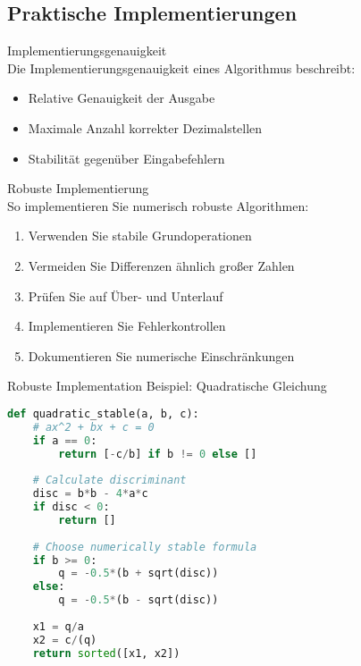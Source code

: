\subsection{Praktische Implementierungen}

\begin{definition}{Implementierungsgenauigkeit}\\
Die Implementierungsgenauigkeit eines Algorithmus beschreibt:
\begin{itemize}
    \item Relative Genauigkeit der Ausgabe
    \item Maximale Anzahl korrekter Dezimalstellen
    \item Stabilität gegenüber Eingabefehlern
\end{itemize}
\end{definition}

\begin{KR}{Robuste Implementierung}\\
So implementieren Sie numerisch robuste Algorithmen:
\begin{enumerate}
    \item Verwenden Sie stabile Grundoperationen
    \item Vermeiden Sie Differenzen ähnlich großer Zahlen
    \item Prüfen Sie auf Über- und Unterlauf
    \item Implementieren Sie Fehlerkontrollen
    \item Dokumentieren Sie numerische Einschränkungen
\end{enumerate}
\end{KR}

\begin{example2}{Robuste Implementation} Beispiel: Quadratische Gleichung
\begin{lstlisting}[language=Python, style=basesmol]
def quadratic_stable(a, b, c):
    # ax^2 + bx + c = 0
    if a == 0:
        return [-c/b] if b != 0 else []
        
    # Calculate discriminant
    disc = b*b - 4*a*c
    if disc < 0:
        return []
        
    # Choose numerically stable formula
    if b >= 0:
        q = -0.5*(b + sqrt(disc))
    else:
        q = -0.5*(b - sqrt(disc))
        
    x1 = q/a
    x2 = c/(q)
    return sorted([x1, x2])
\end{lstlisting}
\end{example2}

